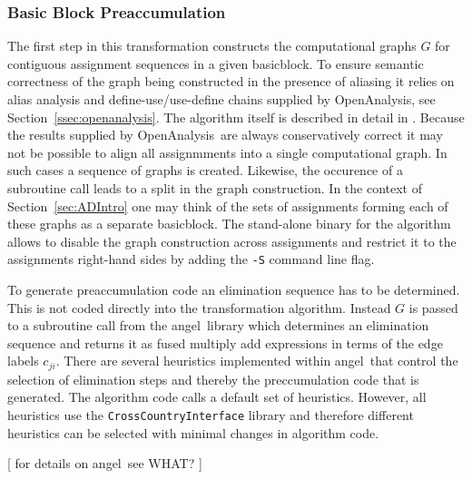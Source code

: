 \documentclass[acmtocl,acmnow]{acmtrans2m}
\newcommand{\angel}{angel}
\newcommand{\basicblock}{basicblock}
\newcommand{\OpenAnalysis}{OpenAnalysis}
\newcommand{\code}[1]{{\small\tt{#1}}}
\newcommand{\refsec}[1]{Section~\ref{#1}}
\begin{document}
\subsubsection{Basic Block Preaccumulation}\label{sssec:BBPreacc}

The first step in this transformation constructs the computational graphs $G$ 
for contiguous 
assignment sequences in a given \basicblock. To ensure semantic 
correctness of the graph being constructed in the presence of 
aliasing it relies on alias analysis and define-use/use-define chains 
supplied by \OpenAnalysis, see \refsec{ssec:openanalysis}.
The algorithm itself is described in detail in \cite{Utk04FBB}.
Because the results supplied by \OpenAnalysis\ are always 
conservatively correct it may not be possible to align all 
assignmments into a single computational graph. In such cases 
a sequence of graphs is created. Likewise, the occurence 
of a subroutine call leads to a split in the graph construction. 
In the context of \refsec{sec:ADIntro} one may think of the sets of 
assignments forming each of these graphs as a separate \basicblock. 
The stand-alone binary for the algorithm allows to disable 
the graph construction across assignments and restrict it to 
the assignments right-hand sides by adding the \code{-S} command 
line flag. 

To generate preaccumulation code an elimination sequence has to be determined. 
This is not coded directly into the transformation algorithm. Instead 
$G$ is passed to a subroutine call from the \angel\ library \cite{angelWeb}
which determines an elimination sequence and returns it as 
fused multiply add expressions in terms of the edge labels $c_{ji}$.
There are several heuristics implemented within \angel\ that control 
the selection of elimination steps and thereby the preccumulation code 
that is generated.  The algorithm code calls a default set of heuristics. 
However, all heuristics use the \code{CrossCountryInterface} library and therefore 
different heuristics can be selected with minimal changes in algorithm code.   

{\color{Red} [ for details on \angel\ see WHAT? ] } 
\end{document}
